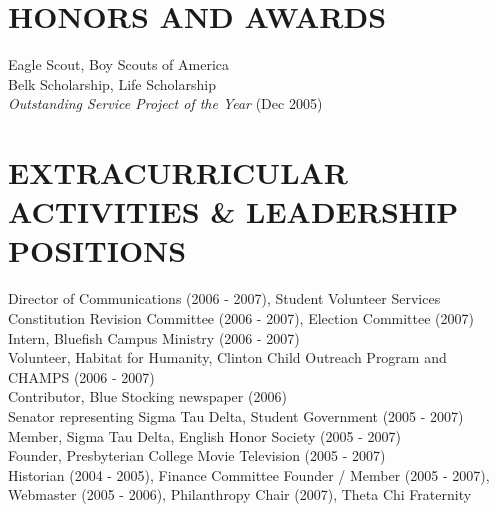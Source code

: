 \documentclass{res}
\begin{document}
\begin{resume}
\section{HONORS AND AWARDS}          
    Eagle Scout, Boy Scouts of America \\
    Belk Scholarship, Life Scholarship \\
    \textit{Outstanding Service Project of the Year} (Dec 2005)   
       
 
\section{EXTRACURRICULAR ACTIVITIES \& LEADERSHIP POSITIONS}          
    Director of Communications (2006 - 2007), Student Volunteer Services\\
    Constitution Revision Committee (2006 - 2007), Election Committee (2007)\\
    Intern, Bluefish Campus Ministry (2006 - 2007)\\
    Volunteer, Habitat for Humanity, Clinton Child Outreach Program and CHAMPS (2006 - 2007)\\
    Contributor, Blue Stocking newspaper (2006)\\
    Senator representing Sigma Tau Delta, Student Government (2005 - 2007)\\
    Member, Sigma Tau Delta, English Honor Society (2005 - 2007)\\
    Founder, Presbyterian College Movie Television (2005 - 2007)\\
    Historian (2004 - 2005), Finance Committee Founder / Member (2005 - 2007), Webmaster (2005 - 2006), Philanthropy Chair (2007), Theta Chi Fraternity
         
 
\end{resume}
\end{document}
